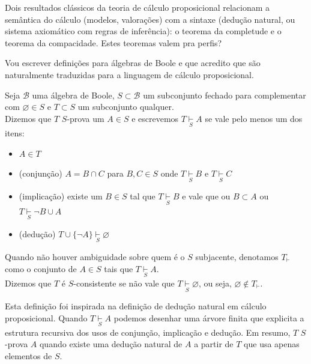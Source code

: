 \documentclass[11pt]{article}
\theoremstyle{definition}
\theoremstyle{definition}
\theoremstyle{definition}
\theoremstyle{definition}
\theoremstyle{definition}
\theoremstyle{definition}
\theoremstyle{definition}
\theoremstyle{definition}
\newtheorem*{definition*}{Definição}
\newenvironment{definicao*}{
\definecolor{shadecolor}{HTML}{defcfc}
\begin{shaded}
\begin{definition*}
}
{
\end{definition*}
\end{shaded}
}
\theoremstyle{definition}
\theoremstyle{definition}
\theoremstyle{definition}
\theoremstyle{definition}
\theoremstyle{definition}
\theoremstyle{definition}
\begin{document}
Dois resultados clássicos da teoria de cálculo proposicional relacionam a semântica do cálculo (modelos, valorações) com a sintaxe (dedução natural, ou sistema axiomático com regras de inferência): o teorema da completude e o teorema da compacidade. Estes teoremas valem pra perfis? 

Vou escrever definições para álgebras de Boole e que acredito que são naturalmente traduzidas para a linguagem de cálculo proposicional.


\newcommand{\Sproves}[1]{\underset{#1}{\vdash}}

\begin{definicao*}


  Seja $\mathcal{B}$ uma álgebra de Boole, $S \subset \mathcal{B}$ um subconjunto fechado para complementar com $\varnothing \in S$ e $T \subset S$ um subconjunto qualquer. \\
  
  Dizemos que $T$ $S$-prova um $A \in S$ e escrevemos $T \Sproves{S} A$ se vale pelo menos um dos itens:
    
  \begin{itemize}[label=]
   \item $A \in T$
    \item (conjunção) $A = B \cap C$ para $B,C \in S$ onde $T \Sproves{S} B$ e $T \Sproves{S} C$
    \item (implicação) existe um $B \in S$ tal que $T \Sproves{S} B$ e vale que ou $B \subset A$ ou $T \Sproves{S} \lnot B \cup A$
    \item (dedução) $T \cup \{\lnot A\} \Sproves{S} \varnothing $
  \end{itemize} 

  Quando não houver ambiguidade sobre quem é o $S$ subjacente, denotamos $T_{\vdash}$ como o conjunto de $A \in S$ tais que $T \Sproves{S} A$.\\

  Dizemos que $T$ é $S$-consistente se não vale que $T \Sproves{S} \varnothing$, ou seja, $\varnothing \notin T_{\vdash}$.
\end{definicao*}

Esta definição foi inspirada na definição de dedução natural em cálculo proposicional. Quando $T \Sproves{S} A$ podemos desenhar uma árvore finita que explicita a estrutura recursiva dos usos de conjunção, implicação e dedução. Em resumo, $T$ $S$-prova $A$ quando existe uma dedução natural de $A$ a partir de $T$ que usa apenas elementos de $S$.
\end{document}
